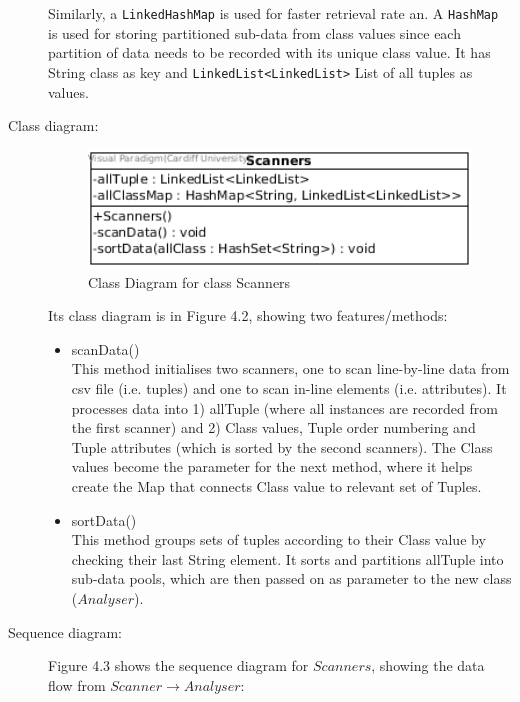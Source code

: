 \begin{description}
Similarly, a \texttt{LinkedHashMap} is used for faster retrieval rate an. A \texttt{HashMap} is used for storing partitioned sub-data from class values since each partition of data needs to be recorded with its unique class value. It has String class as key and \texttt{LinkedList<LinkedList>} List of all tuples as values. 

\item[Class diagram: ] 

\begin{figure}[h]
    \centering
    \includegraphics[width=4in]{figures/class_scanners}
    \caption[Class Diagram for class Scanners]{Class Diagram for class Scanners}
    \label{fig:figure4_2}
\end{figure}

Its class diagram is in Figure 4.2, showing two features/methods:
\begin{itemize}
	\item{scanData()} \\
	This method initialises two scanners, one to scan line-by-line data from csv file (i.e. tuples) and one to scan in-line elements (i.e. attributes).
	It processes data into 1) allTuple (where all instances are recorded from the first scanner) and 2) Class values, Tuple order numbering and Tuple attributes (which is sorted by the second scanners).
	The Class values become the parameter for the next method, where it helps create the Map that connects Class value to relevant set of Tuples.
	\item{sortData()} \\
	This method groups sets of tuples according to their Class value by checking their last String element. It sorts and partitions allTuple into sub-data pools, which are then passed on as parameter to the new class ($Analyser$).
	
\end{itemize}

\item[Sequence diagram: ] 

Figure 4.3 shows the sequence diagram for $Scanners$, showing the data flow from $Scanner \rightarrow Analyser$:


\end{description}

